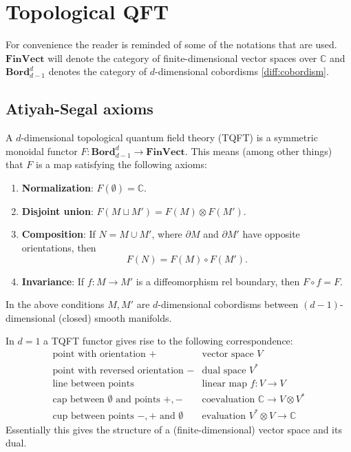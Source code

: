 \section{Topological QFT}

    For convenience the reader is reminded of some of the notations that are used. $\mathbf{FinVect}$ will denote the category of finite-dimensional vector spaces over $\mathbb{C}$ and $\mathbf{Bord}^d_{d-1}$ denotes the category of $d$-dimensional cobordisms \ref{diff:cobordism}.

\subsection{Atiyah-Segal axioms}

    \begin{axiom}
        A $d$-dimensional topological quantum field theory (TQFT) is a symmetric monoidal functor $F:\mathbf{Bord}_{d-1}^d\rightarrow\mathbf{FinVect}$. This means (among other things) that $F$ is a map satisfying the following axioms:
        \begin{enumerate}
            \item\textbf{Normalization}: $F(\emptyset)=\mathbb{C}$.
            \item\textbf{Disjoint union}: $F(M\sqcup M') = F(M)\otimes F(M')$.
            \item\textbf{Composition}: If $N=M\cup M'$, where $\partial M$ and $\partial M'$ have opposite orientations, then \[F(N) = F(M)\circ F(M').\]
            \item\textbf{Invariance}: If $f: M\rightarrow M'$ is a diffeomorphism rel boundary, then $F\circ f = F$.
        \end{enumerate}
        In the above conditions $M,M'$ are $d$-dimensional cobordisms between $(d-1)$-dimensional (closed) smooth manifolds.
    \end{axiom}

    \begin{example}[1D]
        In $d=1$ a TQFT functor gives rise to the following correspondence:
        \begin{equation*}
            \begin{array}{l|l}
                \text{point with orientation } + & \text{vector space } V\\
                \text{point with reversed orientation } - & \text{dual space }V^*\\
                \text{line between points} & \text{linear map }f:V\rightarrow V\\
                \text{cap between $\emptyset$ and points } +,- & \text{coevaluation } \mathbb{C}\rightarrow V\otimes V^*\\
                \text{cup between points $-,+$ and }\emptyset & \text{evaluation }V^*\otimes V\rightarrow\mathbb{C}
            \end{array}
        \end{equation*}
        Essentially this gives the structure of a (finite-dimensional) vector space and its dual.
    \end{example}

